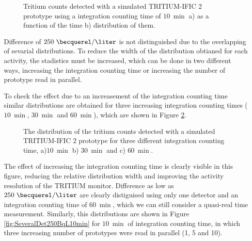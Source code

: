 \begin{figure}[h]
 \centering
 \caption{Tritium counts detected with a simulated TRITIUM-IFIC 2 prototype using a integration counting time of $10~\min$ a) as a function of the time b) distribution of them.}
 \label{fig:1Det10Min250BqL}
\end{figure}

Difference of $250~\becquerel/\liter$ is not distinguished due to the overlapping of sevarial distributions. To reduce the width of the distribution obtianed for each activity, the stadistics must be increased, which can be done in two different ways, increasing the integration counting time or increasing the number of prototype read in parallel.

To check the effect due to an increasement of the integration counting time similar distributions are obtained for three increasing integration counting times ($10~\min$, $30~\min$ and $60~\min$), which are shown in Figure \ref{fig:1Det250BqLseveralTimes}. 

\begin{figure}[h]
 \centering
   \newline
 \caption{The distribution of the tritium counts detected with a simulated TRITIUM-IFIC 2 prototype for three different integration counting time, a)$10~\min$ b) $30~\min$ and c) $60~\min$.}
 \label{fig:1Det250BqLseveralTimes}
\end{figure}

The effect of increasing the integration counting time is clearly visible in this figure, reducing the relative distribution width and improving the activity resolution of the TRITIUM monitor. Difference as low as $250~\becquerel/\liter$ are clearly distiguised using only one detector and an integration counting time of $60~\min$, which we can still consider a quasi-real time measurement. Similarly, this distributions are shown in Figure \ref{fig:SeveralDet250BqL10min} for $10~\min$ of integration counting time, in which three increasing number of prototypes were read in parallel (1, 5 and 10).

